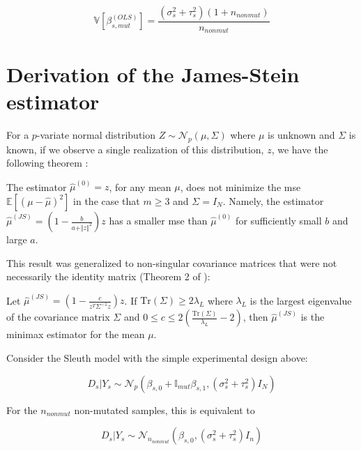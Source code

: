 \begin{equation}
  \mathbb{V} \left[\beta_{s, mut}^{(OLS)} \right] = \frac{(\sigma_s^2 + \tau_s^2)(1 + n_{nonmut})}{n_{nonmut}}
\end{equation}

\section{Derivation of the James-Stein estimator}

For a $p$-variate normal distribution $Z \sim \mathcal{N}_p(\mu, \Sigma)$ where $\mu$ is unknown and $\Sigma$ is known, if we observe a single realization of this distribution, $z$, we have the following theorem \cite{steinInadmissibilityUsualEstimator1956}:

\begin{theorem}
  The estimator $\hat{\mu}^{(0)} = z$, for any mean $\mu$, does not minimize the \gls{mse} $\mathbb{E} \left[ (\mu - \hat{\mu})^2 \right]$ in the case that $m \ge 3$ and $\Sigma = I_N$. Namely, the estimator $\hat{\mu}^{(JS)} = \left( 1 - \frac{b}{a + \Vert z \Vert ^2}\right) z$ has a smaller \gls{mse} than $\hat{\mu}^{(0)}$ for sufficiently small $b$ and large $a$.
\end{theorem}

This result was generalized to non-singular covariance matrices that were not necessarily the identity matrix (Theorem 2 of \cite[REF][]{bockMinimaxEstimatorsMean1975}):

\begin{theorem}
  Let $\hat{\mu}^{(JS)} = \left( 1 - \frac{c}{z^T \Sigma^{-1} z}\right) z$. If $\text{Tr}(\Sigma) \ge 2 \lambda_L$ where $\lambda_L$ is the largest eigenvalue of the covariance matrix $\Sigma$ and $0 \le c \le 2 \left( \frac{\text{Tr}(\Sigma)}{\lambda_L} - 2 \right)$, then $\hat{\mu}^{(JS)}$ is the minimax estimator for the mean $\mu$.
\end{theorem}

Consider the Sleuth model with the simple experimental design above:

\begin{equation*}
  D_s | Y_s \sim \mathcal{N}_p \left( \beta_{s,0} + \mathbb{I}_{mut}\beta_{s,1}, (\sigma_s^2 + \tau_s^2)I_N \right)
\end{equation*}

For the $n_{nonmut}$ non-mutated samples, this is equivalent to

\begin{equation*}
  D_s | Y_s \sim \mathcal{N}_{n_{nonmut}} \left( \beta_{s,0}, (\sigma_s^2 + \tau_s^2)I_n \right)
\end{equation*}

